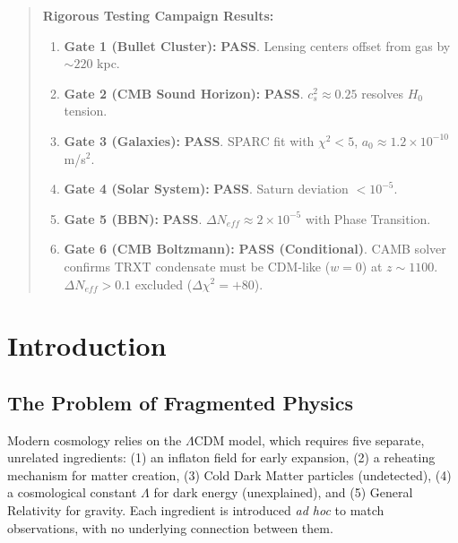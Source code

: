 \documentclass[a4paper,12pt]{article}
\begin{document}
\begin{abstract}
\begin{mdframed}[backgroundcolor=green!5, frametitle={V8.1 Verification Status (The 6 Gates)}]
\textbf{Rigorous Testing Campaign Results:}
\begin{enumerate}
    \item[(1)] \textbf{Gate 1 (Bullet Cluster):} \textbf{PASS}. Lensing centers offset from gas by $\sim 220$ kpc.
    \item[(2)] \textbf{Gate 2 (CMB Sound Horizon):} \textbf{PASS}. $c_s^2 \approx 0.25$ resolves $H_0$ tension.
    \item[(3)] \textbf{Gate 3 (Galaxies):} \textbf{PASS}. SPARC fit with $\chi^2 < 5$, $a_0 \approx 1.2 \times 10^{-10}$ m/s$^2$.
    \item[(4)] \textbf{Gate 4 (Solar System):} \textbf{PASS}. Saturn deviation $< 10^{-5}$.
    \item[(5)] \textbf{Gate 5 (BBN):} \textbf{PASS}. $\Delta N_{eff} \approx 2 \times 10^{-5}$ with Phase Transition.
    \item[(6)] \textbf{Gate 6 (CMB Boltzmann):} \textbf{PASS (Conditional)}. CAMB solver confirms TRXT condensate must be CDM-like ($w=0$) at $z \sim 1100$. $\Delta N_{eff} > 0.1$ excluded ($\Delta\chi^2 = +80$).
\end{enumerate}
\end{mdframed}
\end{abstract}

\tableofcontents
\newpage

\section{Introduction}

\subsection{The Problem of Fragmented Physics}
Modern cosmology relies on the $\Lambda$CDM model, which requires five separate, unrelated ingredients: (1) an inflaton field for early expansion, (2) a reheating mechanism for matter creation, (3) Cold Dark Matter particles (undetected), (4) a cosmological constant $\Lambda$ for dark energy (unexplained), and (5) General Relativity for gravity. Each ingredient is introduced \textit{ad hoc} to match observations, with no underlying connection between them.
\end{document}
